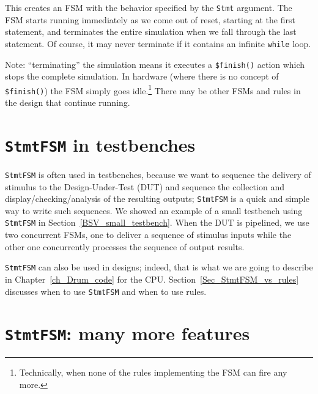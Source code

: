 This creates an FSM with the behavior specified by the \verb|Stmt|
argument.  The FSM starts running immediately as we come out of reset,
starting at the first statement, and terminates the entire simulation
when we fall through the last statement.  Of course, it may never
terminate if it contains an infinite {\tt while} loop.

Note: ``terminating'' the simulation means it executes a
\verb|$finish()| action which stops the complete simulation.  In
hardware (where there is no concept of \verb|$finish()|) the FSM
simply goes idle.\footnote{Technically, when none of the rules implementing
the FSM can fire any more.}  There may be other FSMs and rules in the
design that continue running.


\section{{\tt StmtFSM} in testbenches}

\label{Sec_StmtFSM_in_testbenches}


\verb|StmtFSM| is often used in testbenches, because we want to
sequence the delivery of stimulus to the Design-Under-Test (DUT) and
sequence the collection and display/checking/analysis of the resulting
outputs; \verb|StmtFSM| is a quick and simple way to write such
sequences.  We showed an example of a small testbench using
\verb|StmtFSM| in Section~\ref{BSV_small_testbench}.  When the DUT is
pipelined, we use two concurrent FSMs, one to deliver a sequence of
stimulus inputs while the other one concurrently processes the
sequence of output results.

\verb|StmtFSM| can also be used in designs; indeed, that is what we
are going to describe in Chapter~\ref{ch_Drum_code} for the {\DRUM} CPU.
Section~\ref{Sec_StmtFSM_vs_rules} discusses when to use
\verb|StmtFSM| and when to use rules.


\section{{\tt StmtFSM}: many more features}

\label{Sec_StmtFSM_more_features}


